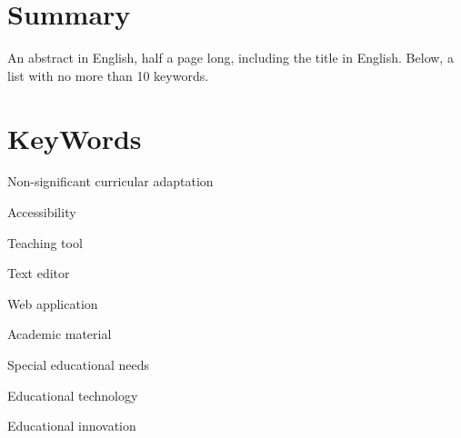 \chapter{Summary}

An abstract in English, half a page long, including the title in English. Below, a list with no more than 10 keywords.


\chapter{KeyWords}

Non-significant curricular adaptation

Accessibility

Teaching tool

Text editor

Web application

Academic material

Special educational needs

Educational technology

Educational innovation


